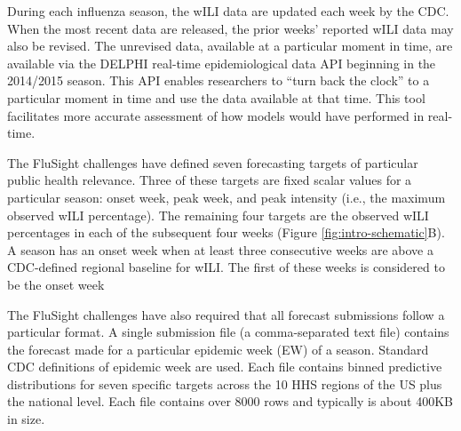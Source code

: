 \documentclass{article}\usepackage[]{graphicx}\usepackage[]{color}
\begin{document}
During each influenza season, the wILI data are updated each week by the CDC. When the most recent data are released, the prior weeks' reported wILI data may also be revised. 
The unrevised data, available at a particular moment in time, are available via the DELPHI real-time epidemiological data API beginning in the 2014/2015 season.\cite{DELPHI} 
This API enables researchers to ``turn back the clock'' to a particular moment in time and use the data available at that time. This tool facilitates more accurate assessment of how models would have performed in real-time. 


The FluSight challenges have defined seven forecasting targets of particular public health relevance. Three of these targets are fixed scalar values for a particular season: onset week, peak week, and peak intensity (i.e., the maximum observed wILI percentage). The remaining four targets are the observed wILI percentages in each of the subsequent four weeks (Figure \ref{fig:intro-schematic}B). A season has an onset week when at least three consecutive weeks are above a CDC-defined regional baseline for wILI. The first of these weeks is considered to be the onset week 

The FluSight challenges have also required that all forecast submissions follow a particular format. A single submission file (a comma-separated text file) contains the forecast made for a particular epidemic week (EW) of a season. Standard CDC definitions of epidemic week are used.\cite{NewMexicoDepartmentofHealth,Niemi2015,Tushar2018} Each file contains binned predictive distributions for seven specific targets across the 10 HHS regions of the US plus the national level. Each file contains over 8000 rows and typically is about 400KB in size.
\end{document}

